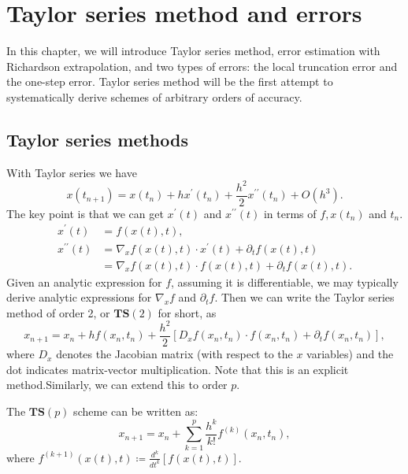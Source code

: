 \chapter{Taylor series method and errors} 
In this chapter, we will introduce Taylor series method, error estimation with Richardson extrapolation, and
two types of errors: the local truncation error and the one-step
error. Taylor series method will be the first attempt to systematically
derive schemes of arbitrary orders of accuracy. 

\section{Taylor series methods}
With Taylor series we have 
\[
    x\left(t_{n+1}\right)=x\left(t_n\right)+h x^{\prime}\left(t_n\right)+\frac{h^2}{2} x^{\prime \prime}\left(t_n\right)+O\left(h^3\right) .  
\]
The key point is that we can get $x^\prime (t) $ and $ x^{\prime \prime} (t) $ in terms of $ f, x(t_n) $ and $ t_n $. 
\begin{align*}
    x^\prime (t) &= f(x(t),t), \\ 
        x^{\prime \prime}(t) & =\nabla_x f(x(t), t) \cdot x^{\prime}(t)+\partial_t f(x(t), t) \\
        & =\nabla_x f(x(t), t) \cdot f(x(t), t)+\partial_t f(x(t), t). 
\end{align*}
Given an analytic expression for $f$, assuming it is differentiable, we may typically derive analytic expressions for $\nabla_x f$ and $\partial_t f$. Then we can write the Taylor series method of order 2, or $\mathbf{T S}(2)$ for short, as
$$
x_{n+1}=x_n+h f\left(x_n, t_n\right)+\frac{h^2}{2}\left[D_x f\left(x_n, t_n\right) \cdot f\left(x_n, t_n\right)+\partial_t f\left(x_n, t_n\right)\right],
$$
where $D_x$ denotes the Jacobian matrix (with respect to the $x$ variables) and the dot indicates matrix-vector multiplication. Note that this is an explicit method.Similarly, we can extend this to order $ p $. 


\begin{definition}
\label{def: Taylor series method}
The $ \mathbf{TS}(p) $ scheme can be written as: 
\begin{equation}
\label{eq: Taylor series method}
    x_{n+1} = x_n + \sum_{k=1}^{p} \frac{h^{k}}{k!}f^{(k)}(x_n,t_n), 
\end{equation}
where $ f^{(k+1)}(x(t),t) \coloneqq  \frac{d^{k}}{dt^{k}} [f(x(t),t)] $.  
\end{definition}

